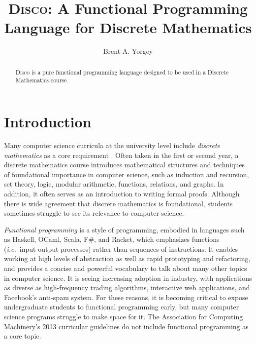 \documentclass[submission,copyright,creativecommons]{eptcs}
\title{\textsc{Disco}: A Functional Programming Language for Discrete Mathematics}
\author{Brent A. Yorgey
\institute{Hendrix College\\ Conway, Arkansas, USA}
\email{yorgey@hendrix.edu}
}
\newcommand{\disco}{\textsc{Disco}\xspace}
\begin{document}
\maketitle

\begin{abstract}
  \disco is a pure functional programming language designed to be used
  in a Discrete Mathematics course.
\end{abstract}

\section{Introduction}

Many computer science curricula at the university level include
\emph{discrete mathematics} as a core requirement \cite{ACM:2013}.
Often taken in the first or second year, a discrete mathematics course
introduces mathematical structures and techniques of foundational
importance in computer science, such as induction and recursion, set
theory, logic, modular arithmetic, functions, relations, and graphs.
In addition, it often serves as an introduction to writing formal
proofs.  Although there is wide agreement that discrete mathematics is
foundational, students sometimes struggle to see its relevance to
computer science.

\emph{Functional programming} is a style of programming, embodied in
languages such as Haskell, OCaml, Scala, F\#, and Racket, which
emphasizes functions (\emph{i.e.}\ input-output processes) rather than
sequences of instructions. It enables working at high levels of
abstraction as well as rapid prototyping and refactoring, and provides
a concise and powerful vocabulary to talk about many other topics in
computer science. It is seeing increasing adoption in industry, with
applications as diverse as high-frequency trading algorithms,
interactive web applications, and Facebook's anti-spam system.  For
these reasons, it is becoming critical to expose undergraduate
students to functional programming early, but many computer science
programs struggle to make space for it.  The Association for Computing
Machinery's 2013 curricular guidelines \cite{ACM:2013} do not include
functional programming as a core topic.
\end{document}
